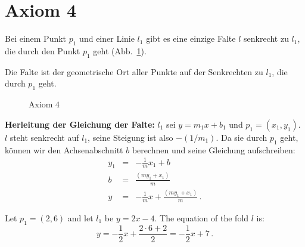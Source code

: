 
\section{Axiom 4}\label{s.ax4}

\begin{axiom}
Bei einem Punkt $p_1$ und einer Linie $l_1$ gibt es eine einzige Falte $l$ senkrecht zu $l_1$, die durch den Punkt $p_1$ geht (Abb.~\ref{f.origami-axiom4}).
\end{axiom}

Die Falte ist der geometrische Ort aller Punkte auf der Senkrechten zu $l_1$, die durch $p_1$ geht.

\begin{figure}[ht]
\begin{center}
\end{center}
\caption{Axiom $4$}\label{f.origami-axiom4}
\end{figure}

\noindent\textbf{Herleitung der Gleichung der Falte:}
$l_1$ sei $y = m_1x + b_1$ und $p_1=(x_1,y_1)$. $l$ steht senkrecht auf $l_1$, seine Steigung ist also $-(1/m_1)$. Da sie durch $p_1$ geht, können wir den Achsenabschnitt $b$ berechnen und seine Gleichung aufschreiben:
\begin{eqnarray*}
y_1&=&-\frac{1}{m} x_1 + b\\
b&=& \frac{(my_1+x_1)}{m}\\
y&=&-\frac{1}{m} x +\frac{(my_1+x_1)}{m}\,.
\end{eqnarray*}
\begin{example}
Let $p_1=(2,6)$ and let $l_1$ be $y=2x-4$. The equation of the fold $l$ is:
\[
y=-\frac{1}{2}x + \frac{2\cdot 6 + 2}{2}=-\frac{1}{2}x + 7\,.
\]
\end{example}


